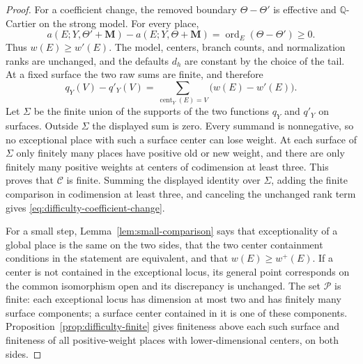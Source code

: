 \documentclass[11pt]{amsart}
\theoremstyle{definition}
\theoremstyle{remark}
\numberwithin{equation}{section}
\newcommand{\Q}{\mathbb{Q}}
\newcommand{\M}{\mathbf{M}}
\DeclareMathOperator{\cent}{cent}
\DeclareMathOperator{\ord}{ord}
\begin{document}
\begin{proof}
For a coefficient change, the removed boundary \(\Theta-\Theta'\) is
effective and \(\Q\)-Cartier on the strong model.  For every place,
\[
 a(E;Y,\Theta'+\M)-a(E;Y,\Theta+\M)
 =\ord_E(\Theta-\Theta')\geq0.
\]
Thus \(w(E)\geq w'(E)\).  The model, centers, branch counts, and
normalization ranks are unchanged, and the defaults \(d_h\) are constant
by the choice of the tail.  At a fixed surface the two raw sums are finite,
and therefore
\[
 q_Y(V)-q'_Y(V)=\sum_{\cent_Y(E)=V}\bigl(w(E)-w'(E)\bigr).
\]
Let \(\Sigma\) be the finite union of the supports of the two functions
\(q_Y\) and \(q'_Y\) on surfaces.  Outside \(\Sigma\) the displayed
sum is zero.  Every summand is nonnegative, so no exceptional place with
such a surface center can lose weight.  At each surface of \(\Sigma\)
only finitely many places have positive old or new weight, and there are
only finitely many positive weights at centers of codimension at least
three.  This proves that \(\mathcal C\) is finite.  Summing the displayed
identity over \(\Sigma\), adding the finite comparison in codimension at
least three, and canceling the unchanged rank term gives
\eqref{eq:difficulty-coefficient-change}.

For a small step, Lemma~\ref{lem:small-comparison} says that exceptionality
of a global place is the same on the two sides, that the two center
containment conditions in the statement are equivalent, and that
\(w(E)\geq w^+(E)\).  If a center is not contained in the exceptional
locus, its general point corresponds on the common isomorphism open and its
discrepancy is unchanged.  The set \(\mathcal P\) is finite: each
exceptional locus has dimension at most two and has finitely many surface
components; a surface center contained in it is one of these components.
Proposition~\ref{prop:difficulty-finite} gives finiteness above each such
surface and finiteness of all positive-weight places with lower-dimensional
centers, on both sides.


\end{proof}
\end{document}
